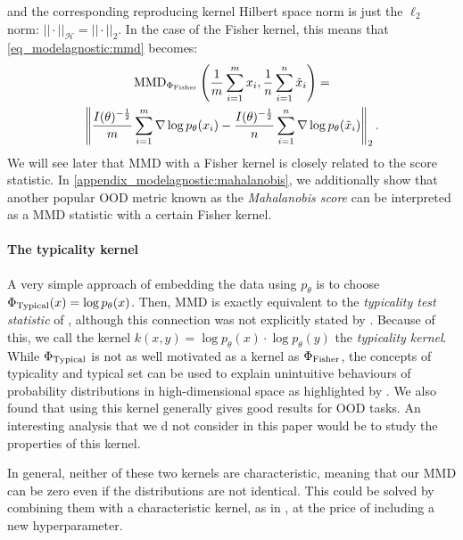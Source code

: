 {and the corresponding reproducing kernel Hilbert space norm is just the $\ell_2$ norm: $|| \cdot || _\mathcal{H} = || \cdot ||_2$. In the case of the Fisher kernel, this means that \cref{eq_modelagnostic:mmd} becomes:
\begin{multline}
    \label{eq_modelagnostic:mmd_fisher}
    \textup{MMD}_{\Phi_\textup{Fisher}}\left(\frac{1}{m} \sum_{i=1}^{m} x_i,\frac{1}{n}\sum_{i=1}^n \tilde{x}_i\right) = \\ \left\|\frac{I(\theta)^{-\frac{1}{2}}}{m} \sum_{i=1}^{m}  \nabla \log p_\theta (x_i) - \frac{I(\theta)^{-\frac{1}{2}}}{n}  \sum_{i=1}^{n}  \nabla \log p_\theta (\tilde{x}_i)\right\|_2.
\end{multline}
We will see later that MMD with a Fisher kernel is closely related to the score statistic. In \cref{appendix_modelagnostic:mahalanobis}, we additionally show that another popular OOD metric known as the \emph{Mahalanobis score} \parencite{lee_simple_2018} can be interpreted as a MMD statistic with a certain Fisher kernel.




\paragraph{The typicality kernel} A very simple approach of embedding the data using $p_\theta$ is to choose $\Phi_\textup{Typical}(x) = \log p_\theta (x)$. Then, MMD is exactly equivalent to the \emph{typicality test statistic} of \textcite{nalisnick_detecting_2019}, although this connection was not explicitly stated  by \textcite{nalisnick_detecting_2019}. Because of this, we call the kernel $k(x,y) = \log p_\theta (x) \cdot \log p_\theta (y)$ the \emph{typicality kernel}.  %
While $\Phi_\textup{Typical}$ is not as well motivated as a kernel as $\Phi_\textup{Fisher}$, the concepts of typicality and typical set can be used to explain unintuitive behaviours of probability distributions in high-dimensional space as highlighted by \textcite{nalisnick_deep_2019}. We also found that using this kernel generally gives good results for OOD tasks. An interesting analysis that we d not consider in this paper would be to study the properties of this kernel.



In general, neither of these two kernels are characteristic, meaning that our MMD can be zero even if the distributions are not identical. This could be solved by combining them with a characteristic kernel, as in \textcite{liu_learning_2020}, at the price of including a new hyperparameter.


}
